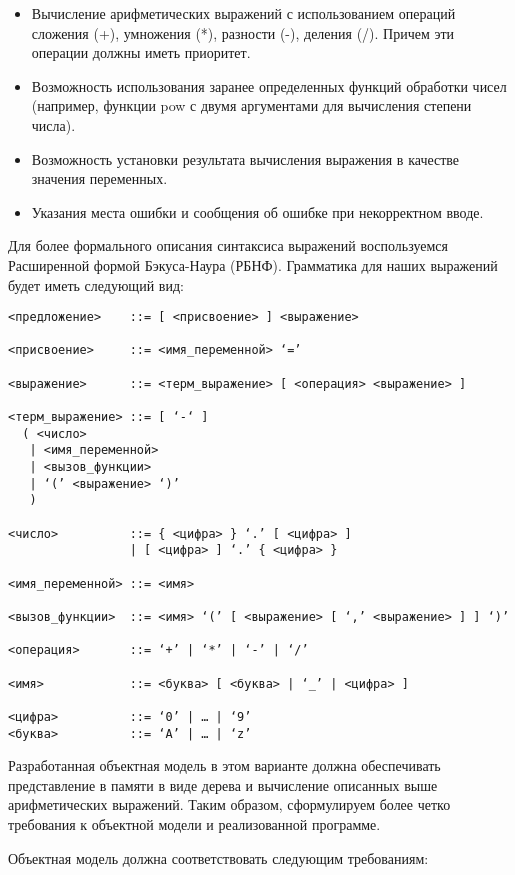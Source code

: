 \documentclass[a4paper,12pt]{article}
\begin{document}
\begin{itemize}
\item Вычисление арифметических выражений с использованием операций
  сложения (+), умножения (*), разности (-), деления (/). Причем эти
  операции должны иметь приоритет.
\item Возможность использования заранее определенных функций обработки
  чисел (например, функции pow с двумя аргументами для вычисления
  степени числа).
\item Возможность установки результата вычисления выражения в качестве
  значения переменных.
\item Указания места ошибки и сообщения об ошибке при некорректном вводе.
\end{itemize}

Для более формального описания синтаксиса выражений воспользуемся
Расширенной формой Бэкуса-Наура (РБНФ). Грамматика для наших выражений
будет иметь следующий вид:

\begin{verbatim}
<предложение>    ::= [ <присвоение> ] <выражение>

<присвоение>     ::= <имя_переменной> ‘=’

<выражение>      ::= <терм_выражение> [ <операция> <выражение> ]

<терм_выражение> ::= [ ‘-‘ ]
  ( <число>
   | <имя_переменной>
   | <вызов_функции>
   | ‘(’ <выражение> ‘)’
   )

<число>          ::= { <цифра> } ‘.’ [ <цифра> ]
                 | [ <цифра> ] ‘.’ { <цифра> }

<имя_переменной> ::= <имя>

<вызов_функции>  ::= <имя> ‘(’ [ <выражение> [ ‘,’ <выражение> ] ] ‘)’

<операция>       ::= ‘+’ | ‘*’ | ‘-’ | ‘/’

<имя>            ::= <буква> [ <буква> | ‘_’ | <цифра> ]

<цифра>          ::= ‘0’ | … | ‘9’
<буква>          ::= ‘A’ | … | ‘z’
\end{verbatim}

Разработанная объектная модель в этом варианте должна обеспечивать
представление в памяти в виде дерева и вычисление описанных выше
арифметических выражений. Таким образом, сформулируем более четко
требования к объектной модели и реализованной программе.

Объектная модель должна соответствовать следующим требованиям:
\end{document}
